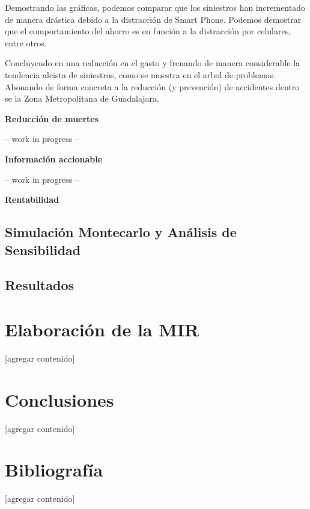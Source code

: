 \documentclass{article}
\begin{document}
Demostrando las gráficas, podemos comparar que los siniestros han incrementado de manera drástica debido a la distracción de Smart Phone. Podemos demostrar que el comportamiento del ahorro es en función a la distracción por celulares, entre otros. 
 
Concluyendo en una reducción en el gasto y frenando de manera considerable la tendencia alcista de siniestros, como se muestra en el arbol de problemas. Abonando de forma concreta a la reducción (y prevención) de accidentes dentro se la Zona Metropolitana de Guadalajara. 

\textbf{Reducción de muertes}

-- work in progress --

\textbf{Información accionable}

-- work in progress --

\textbf{Rentabilidad}


\subsection{Simulación Montecarlo y Análisis de Sensibilidad}

\subsection{Resultados}
% 
% 

\newpage
\section{Elaboración de la MIR}\label{sec:mir}
[agregar contenido]

\newpage
\section{Conclusiones}\label{sec:conclutions}
[agregar contenido]

\newpage
\section{Bibliografía}\label{sec:references}
[agregar contenido]
\end{document}
